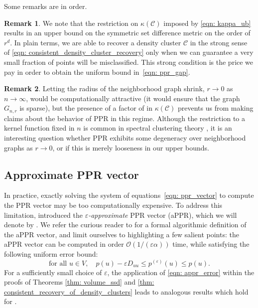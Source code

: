 \documentclass[11pt,twoside]{article}
\theoremstyle{definition}
\newtheorem{remark}{Remark}
\newcommand{\1}{\mathbbm{1}}
\newcommand{\pbf}{p}        %
\newcommand{\Xbf}{X}
\newcommand{\Dbf}{D}
\newcommand{\Cset}{\mathcal{C}}
\newcommand{\Csig}{\Cset_{\sigma}}
\newcommand{\Cest}{\widehat{C}}
\begin{document}
Some remarks are in order.

\begin{remark}
We note that the restriction on $\kappa(\Cset)$ imposed by \eqref{eqn: kappa_ub} results in an upper bound on the symmetric set difference metric
  \smash{$\Delta(\Cest, \Csig[\Xbf])$} on the order of $r^d$. In plain terms, we 
  are able to recover a  density cluster $\Cset$ in the strong sense of
  \eqref{eqn: consistent_density_cluster_recovery} only when we can guarantee a
  very small fraction of points will be misclassified. This strong condition is
  the price we pay in order to obtain the uniform bound in~\eqref{eqn: ppr_gap}.  
\end{remark}

\begin{remark}
  Letting the radius of the neighborhood graph shrink, $r \to 0$ as $n \to  
  \infty$, would be computationally attractive (it would ensure that the graph 
  $G_{n,r}$ is sparse), but the presence of a factor of 
  in $\kappa(\Cset)$ prevents us from making claims about the behavior of PPR in
  this regime. Although the restriction to a kernel function fixed in $n$ is
  common in spectral clustering theory \citep{schiebinger2015,vonluxburg2008},
  it is an interesting question whether PPR exhibits some degeneracy over 
  neighborhood graphs as $r \to 0$, or if this is merely looseness in our  
  upper bounds.
\end{remark}

\subsection{Approximate PPR vector} 

In practice, exactly solving the system of equations~\eqref{eqn:
  ppr_vector} to compute the PPR vector 
  may be too computationally expensive. To address this limitation,
\citet{andersen2006} introduced the \emph{$\varepsilon$-approximate} PPR vector
(aPPR), which we will denote by \smash{$\pbf^{(\varepsilon)}$}. We refer the
curious reader to \citet{andersen2006} for a formal algorithmic definition of
the aPPR vector, and limit ourselves to highlighting a few salient points: the
aPPR vector can be computed in order $\mathcal{O}(1/(\varepsilon\alpha))$ time,
while satisfying the following uniform error bound: 
\begin{equation}
\label{eqn: appr_error}
\textrm{for all $u \in V$}, \quad \pbf(u) - \varepsilon \Dbf_{uu}\leq
\pbf^{(\varepsilon)}(u) \leq \pbf(u).  
\end{equation}
For a sufficiently small choice of $\varepsilon$, the 
application of \eqref{eqn: appr_error} within the proofs of Theorems
\ref{thm: volume_ssd} and \ref{thm: consistent_recovery_of_density_clusters}  
leads to analogous results which hold for \smash{$\pbf^{(\varepsilon)}$}.
\end{document}
